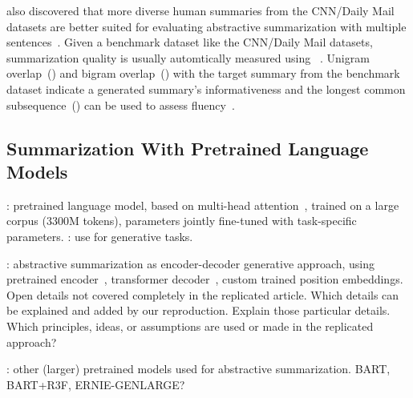 \citeauthor{NallapatiZSGX2016} also discovered that more diverse human summaries from the CNN/Daily Mail datasets are better suited for evaluating abstractive summarization with multiple sentences~\cite{NallapatiZSGX2016,HermannKGEKSB2015}.
Given a benchmark dataset like the CNN/Daily Mail datasets, summarization quality is usually automtically measured using \Rouge~\cite{Lin2004}.
Unigram overlap~() and bigram overlap~() with the target summary from the benchmark dataset indicate a generated summary's informativeness and the longest common subsequence~(\RougeL) can be used to assess fluency~\cite{LiuL2019}.

\subsection{Summarization With Pretrained Language Models}

\citeauthor{DevlinCLT2019}: pretrained language model, based on multi-head attention~\cite{VaswaniSPUJGKP2017}, trained on a large corpus (3300M tokens), \Bert parameters jointly fine-tuned with task-specific parameters.
\citeauthor{Edunov2019?,Rothe2019?}: use \Bert for generative tasks.

\citeauthor{LiuL2019}: abstractive summarization as encoder-decoder generative approach, using pretrained \Bert encoder~\cite{DevlinCLT2019}, transformer decoder~\cite{VaswaniSPUJGKP2017}, custom trained position embeddings.
Open details not covered completely in the replicated article.
Which details can be explained and added by our reproduction.
Explain those particular details.
Which principles, ideas, or assumptions are used or made in the replicated approach?

\citeauthor{???}: other (larger) pretrained models used for abstractive summarization.
BART, BART+R3F, ERNIE-GENLARGE?

